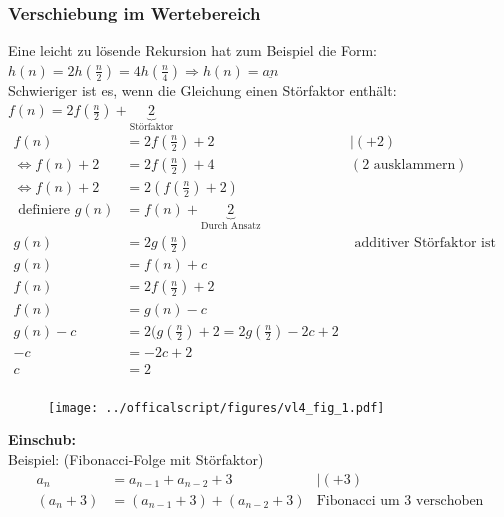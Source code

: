 \subsubsection*{Verschiebung im Wertebereich}
Eine leicht zu lösende Rekursion hat zum Beispiel die Form: $h(n) = 2h (\frac{n}{2}) = 4 h(\frac{n}{4}) \Rightarrow h(n)=\underline{an}$\\
Schwieriger ist es, wenn die Gleichung einen Störfaktor enthält:  $f(n)=2f(\frac {n}{2})+\underbrace{2}_{\text{Störfaktor}}$\\
\begin{align*}
    f(n)&=2f(\frac{n}{2})+2 &|(+2)\\
    \Leftrightarrow f(n)+2&= 2f(\frac{n}{2})+4 & (2\text{ ausklammern})\\
    \Leftrightarrow f(n)+2& = 2 (f(\frac{n}{2})+2)\\
    \text{ definiere } g(n)&=f(n)+\underbrace{2}_{\text{Durch Ansatz}}\\
    g(n)&=2 g(\frac{n}{2})&\text{ additiver Störfaktor ist weg.}\\
    g(n)&=f(n)+c\\
    f(n)&=2 f(\frac{n}{2})+2\\
    f(n)&=g(n)-c\\
    g(n)-c&= 2(g(\frac{n}{2})+2= 2 g(\frac{n}{2})-2c+2\\
    -c&=-2c+2\\
    c&=2\\
\end{align*}
\begin{figure}[h]
    \begin{center}
        \texttt{[image: ../officalscript/figures/vl4\_fig\_1.pdf]}
        \label{fig:graph}
    \end{center}
\end{figure}
%
\textbf{Einschub:}\\
Beispiel: (Fibonacci-Folge mit Störfaktor)\\
\begin{align*}
    a_n &= a_{n-1}+a_{n-2}+3 &|(+3)\\
    (a_n+3) &=  (a_{n-1}+3) + (a_{n-2}+3)&\text{Fibonacci um 3 verschoben}\\
\end{align*}
